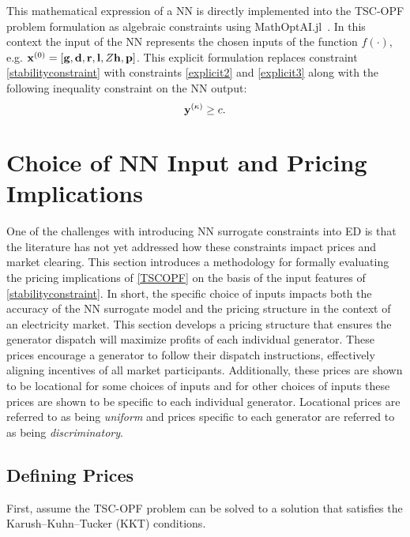\documentclass[lettersize,journal]{IEEEtran}
\begin{document}
This mathematical expression of a NN is directly implemented into the TSC-OPF problem formulation as algebraic constraints using MathOptAI.jl~\cite{MathOptAI2024}.  In this context the input of the NN represents the chosen inputs of the function $f(\cdot)$, e.g. $\bold{x}^{(0)}=[\bold{g},\bold{d},\bold{r},\bold{l},Z\bold{h},\bold{p}]$.  This explicit formulation replaces constraint \eqref{stabilityconstraint} with constraints \eqref{explicit2} and \eqref{explicit3} along with the following inequality constraint on the NN output:
\begin{equation}
\bold{y}^{(\kappa)}\geq c.\label{explicit1}
\end{equation}

\section{Choice of NN Input and Pricing Implications}
One of the challenges with introducing NN surrogate constraints into ED is that the literature has not yet addressed how these constraints impact prices and market clearing.  This section introduces a methodology for formally evaluating the pricing implications of \eqref{TSCOPF} on the basis of the input features of \eqref{stabilityconstraint}.  In short, the specific choice of inputs impacts both the accuracy of the NN surrogate model and the pricing structure in the context of an electricity market.  This section develops a pricing structure that ensures the generator dispatch will maximize profits of each individual generator.  These prices encourage a generator to follow their dispatch instructions, effectively aligning incentives of all market participants. Additionally, these prices are shown to be locational for some choices of inputs and for other choices of inputs these prices are shown to be specific to each individual generator.  Locational prices are referred to as being \emph{uniform} and prices specific to each generator are referred to as being \emph{discriminatory}. 

\subsection{Defining Prices}\label{Sec:Pricing}

First, assume the TSC-OPF problem can be solved to a solution that satisfies the Karush–Kuhn–Tucker (KKT) conditions.  
\normalfont
\end{document}
